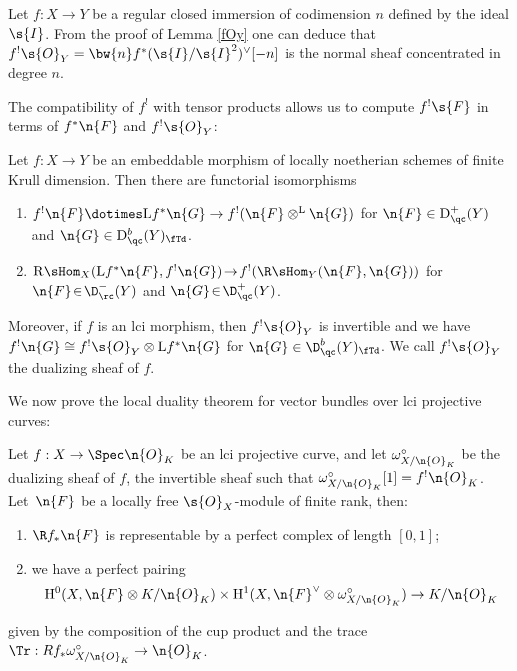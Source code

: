 \begin{remark}
Let $f:X\to Y$ be a regular closed immersion of codimension $n$ defined by the ideal $\s{I}$. From the proof of Lemma \ref{fOy} one can deduce that $f^!\s{O}_Y=\bw{n} f^*(\s{I}/\s{I}^2)^{\vee}[-n]$ is the normal sheaf concentrated in degree $n$.
\end{remark}

The compatibility of $f^!$ with tensor products allows us to compute $f^!\s{F}$ in terms of $f^*\n{F}$ and $f^!\s{O}_Y$:

\begin{prop}
\label{dualizingAndTensor}
Let $f:X\to Y$ be an embeddable morphism of locally noetherian schemes of finite Krull dimension. Then there are functorial isomorphisms
\begin{enumerate}

\item $f^!\n{F}\dotimes \mathrm{L}f^*\n{G}\to f^!(\n{F}\otimes^{\mathrm{L}} \n{G})$ for $\n{F}\in \mathrm{D}_{\qc}^+(Y)$ and $\n{G}\in \mathrm{D}^b_{\qc}(Y)_{\fTd}$.

\item $\mathrm{R} \sHom_X(\mathrm{L}f^*\n{F}, f^! \n{G})\!\to\!f^!(\R \sHom_{Y}(\n{F}, \n{G}))$ for $\n{F}\!\in\!\D^-_{\rc}(Y)$ and $\n{G}\!\in\!\D^+_{\qc}(Y)$.
\end{enumerate}

Moreover, if $f$ is an lci morphism, then $f^!\s{O}_Y$ is invertible and we have $f^!\n{G}\cong f^!\s{O}_Y\otimes \mathrm{L}f^* \n{G}$ for $\n{G}\in \D^{b}_{\qc}(Y)_{\fTd}$. We call $f^! \s{O}_Y$ the dualizing sheaf of $f$.
\end{prop}

We now prove the local duality theorem for vector bundles over lci projective curves:

\begin{prop}
\label{LocalDualityCurves}
Let $f: X\to \Spec \n{O}_K$ be an lci projective curve, and let $\omega_{X/\n{O}_K}^\circ$ be the dualizing sheaf of $f$, \ie the invertible sheaf such that $\omega_{X/\n{O}_K}^\circ[1]=f^!\n{O}_K$. Let~$\n{F}$ be a locally free $\s{O}_X$-module of finite rank, then:
\begin{enumerate}

\item $\R f_*\n{F}$ is representable by a perfect complex of length $[0,1]$;

\item we have a perfect pairing
\begin{align*}
\mathrm{H}^0(X,\n{F}\otimes K/\n{O}_K)\times \mathrm{H}^1(X, \n{F}^\vee\otimes \omega_{X/\n{O}_K}^\circ)\to K/\n{O}_K
\end{align*}
\end{enumerate}
given by the composition of the cup product and the trace $\Tr: Rf_* \omega^{\circ}_{X/\n{O}_K}\to \n{O}_K$.
\end{prop}

